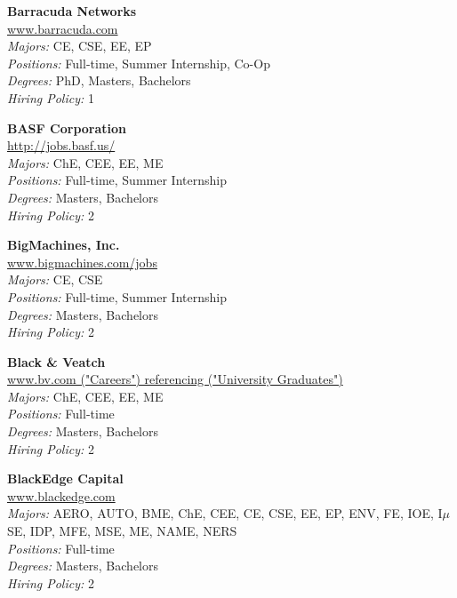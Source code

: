 \documentclass{article}
\begin{document}
\begin{center}
\begin{multicols}{3}
\begin{minipage}{.9\columnwidth}{\Large\bf Barracuda Networks }\\
	\url{www.barracuda.com}\\
	\emph{Majors:} CE, CSE, EE, EP\\
	\emph{Positions:} Full-time, Summer Internship, Co-Op\\
	\emph{Degrees:} PhD, Masters, Bachelors\\
	\emph{Hiring Policy:} 1\\
\end{minipage}
 
\begin{minipage}{.9\columnwidth}{\Large\bf BASF Corporation }\\
	\url{http://jobs.basf.us/}\\
	\emph{Majors:} ChE, CEE, EE, ME\\
	\emph{Positions:} Full-time, Summer Internship\\
	\emph{Degrees:} Masters, Bachelors\\
	\emph{Hiring Policy:} 2\\
\end{minipage}
 
\begin{minipage}{.9\columnwidth}{\Large\bf BigMachines, Inc. }\\
	\url{www.bigmachines.com/jobs}\\
	\emph{Majors:} CE, CSE\\
	\emph{Positions:} Full-time, Summer Internship\\
	\emph{Degrees:} Masters, Bachelors\\
	\emph{Hiring Policy:} 2\\
\end{minipage}
 
\begin{minipage}{.9\columnwidth}{\Large\bf Black \& Veatch }\\
	\url{www.bv.com ("Careers") referencing ("University Graduates")}\\
	\emph{Majors:} ChE, CEE, EE, ME\\
	\emph{Positions:} Full-time\\
	\emph{Degrees:} Masters, Bachelors\\
	\emph{Hiring Policy:} 2\\
\end{minipage}
 
\begin{minipage}{.9\columnwidth}{\Large\bf BlackEdge Capital }\\
	\url{www.blackedge.com}\\
	\emph{Majors:} AERO, AUTO, BME, ChE, CEE, CE, CSE, EE, EP, ENV, FE, IOE, I$\mu$SE, IDP, MFE, MSE, ME, NAME, NERS\\
	\emph{Positions:} Full-time\\
	\emph{Degrees:} Masters, Bachelors\\
	\emph{Hiring Policy:} 2\\
\end{minipage}
 

\end{multicols}
\end{center}
\end{document}
